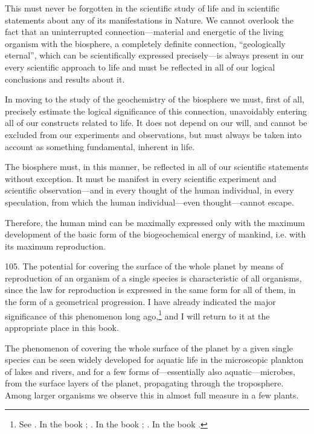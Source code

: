 This must never be forgotten in the scientific study of life and in scientific
statements about any of its manifestations in Nature.  We cannot overlook the
fact that an uninterrupted connection---material and energetic of the living
organism with the biosphere, a completely definite connection, ``geologically
eternal'', which can be scientifically expressed precisely---is always present
in our every scientific approach to life and must be reflected in all of our
logical conclusions and results about it.

In moving to the study of the geochemistry of the biosphere we must, first of
all, precisely estimate the logical significance of this connection,
unavoidably entering all of our constructs related to life.  It does not
depend on our will, and cannot be excluded from our experiments and
observations, but must always be taken into account as something fundamental,
inherent in life.

The biosphere must, in this manner, be reflected in all of our scientific
statements without exception.  It must be manifest in every scientific
experiment and scientific observation---and in every thought of the human
individual, in every speculation, from which the human individual---even
thought---cannot escape.

Therefore, the human mind can be maximally expressed only with the maximum
development of the basic form of the biogeochemical energy of mankind, i.e.
with its maximum reproduction.


105. The potential for covering the surface of the whole planet by means of
reproduction of an organism of a single species is characteristic of all
organisms, since the law for reproduction is expressed in the same form for
all of them, in the form of a geometrical progression.  I have already
indicated the major significance of this phenomenon long ago,\footnote{
	See \cite{vernadsky1926biosfera-p37-38}. In the book
	\cite{vernadsky1994zhivoe-p335}; \cite{vernadsky1926etudes1}.  In the
	book \cite{vernadsky1994zhivoe-p413-424};
	\cite{vernadsky1940biogeohimicheskie-p59-83}. In the book
	\cite{vernadsky1992trudy-p75-101}.
} and I will return to it at the appropriate place in this book.

The phenomenon of covering the whole surface of the planet by a given single
species can be seen widely developed for aquatic life in the microscopic
plankton of lakes and rivers, and for a few forms of---essentially also
aquatic---microbes, from the surface layers of the planet, propagating through
the troposphere.  Among larger organisms we observe this in almost full
measure in a few plants.

